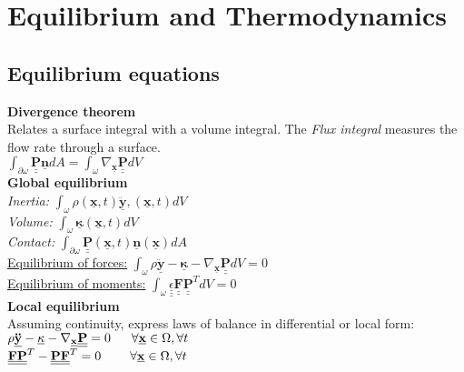 \section{Equilibrium and Thermodynamics}
\subsection*{Equilibrium equations}
\smallskip

\textbf{Divergence theorem} \\
Relates a surface integral with a volume integral.
The \textit{Flux integral} measures the flow rate through a surface. \\
$\int_{\partial \omega} \underline{\underline{\mathbf{P}}} \underline{\mathbf{n}}dA = \int_\omega \nabla_{\underline{\mathbf{x}}} \underline{\underline{\mathbf{P}}} dV$ \\


\textbf{Global equilibrium} \\
\textit{Inertia:} $\int_\omega \rho(\underline{\mathbf{x}},t) \underline{\mathbf{\ddot{y}}},(\underline{\mathbf{x}},t)dV$ \\
\textit{Volume:} $\int_\omega \underline{\mathbf{\kappa}}(\underline{\mathbf{x}},t) dV$ \\
\textit{Contact:} $\int_{\partial \omega} \underline{\underline{\mathbf{P}}}(\underline{\mathbf{x}},t) \underline{\mathbf{n}}(\underline{\mathbf{x}})dA$ \\

\underline{Equilibrium of forces:} \hspace{12.6mm} $\int_\omega \rho \underline{\mathbf{\ddot{y}}}-\underline{\mathbf{\kappa}}-\nabla_{\underline{\mathbf{x}}} \underline{\underline{\mathbf{P}}}dV= 0$ \\
\underline{Equilibrium of moments:} \hspace{8mm} $\int_\omega \underline{\underline{\underline{\epsilon}}}\underline{\underline{\mathbf{F}}}\underline{\underline{\mathbf{P}}}^T dV = 0$ \\


\textbf{Local equilibrium} \\
Assuming continuity, express laws of balance in differential or local form: \\
$\rho \underline{\mathbf{\ddot{y}}}-\underline{\mathbf{\kappa}}-\nabla_{\underline{\mathbf{x}}} \underline{\underline{\mathbf{P}}} = 0 \hspace{5.75mm} \forall \underline{\mathbf{x}} \in \Omega, \forall t$ \\
$\underline{\underline{\mathbf{F}}}\underline{\underline{\mathbf{P}}}^T - \underline{\underline{\mathbf{P}}}\underline{\underline{\mathbf{F}}}^T = 0 \hspace{8mm} \forall \underline{\mathbf{x}} \in \Omega, \forall t$ \\

